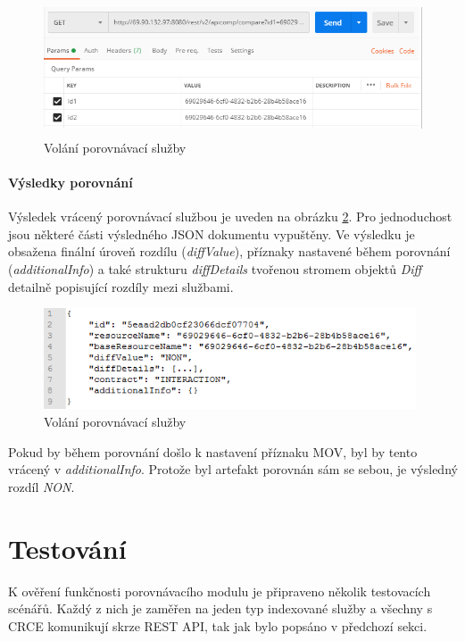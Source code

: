\documentclass[czech,DP]{thesiskiv}
\begin{document}
\begin{figure}[h]
	\centering
	\includegraphics[height=4cm]{apicomp-call.png}
	\caption{Volání porovnávací služby}
	\label{fig:apicomp-call}
\end{figure}

\paragraph{Výsledky porovnání}
Výsledek vrácený porovnávací službou je uveden na obrázku \ref{fig:apicomp-res}. Pro jednoduchost jsou některé části výsledného JSON dokumentu vypuštěny. Ve výsledku je obsažena finální úroveň rozdílu (\textit{diffValue}), příznaky nastavené během porovnání (\textit{additionalInfo}) a také strukturu \textit{diffDetails} tvořenou stromem objektů \textit{Diff} detailně popisující rozdíly mezi službami.

\begin{figure}[h]
	\centering
	\includegraphics[height=3cm]{apicomp-res.png}
	\caption{Volání porovnávací služby}
	\label{fig:apicomp-res}
\end{figure}

Pokud by během porovnání došlo k nastavení příznaku MOV, byl by tento vrácený v \textit{additionalInfo}. Protože byl artefakt porovnán sám se sebou, je výsledný rozdíl \textit{NON}.

\section{Testování}

K ověření funkčnosti porovnávacího modulu je připraveno několik testovacích scénářů. Každý z nich je zaměřen na jeden typ indexované služby a všechny s CRCE komunikují skrze REST API, tak jak bylo popsáno v předchozí sekci.
\end{document}
